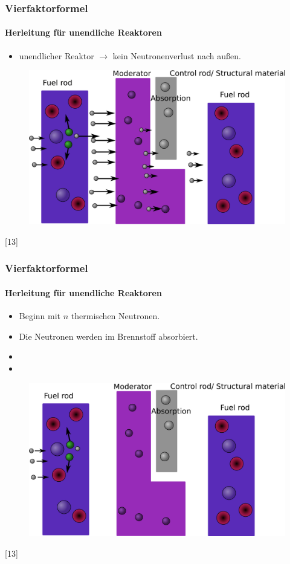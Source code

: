 \documentclass{beamer}[9pt]
\begin{document}
\begin{frame}
\frametitle{Vierfaktorformel}
\framesubtitle{Herleitung für unendliche Reaktoren}
\begin{itemize}
\item unendlicher Reaktor $\rightarrow$ kein Neutronenverlust nach außen.
\end{itemize}

\begin{figure}
\centering
\includegraphics[scale=.2]{thermal_reactor_full.png}
\end{figure}
\hspace{.5\textwidth}[13]
\end{frame}


\begin{frame}
\frametitle{Vierfaktorformel}
\framesubtitle{Herleitung für unendliche Reaktoren}
\begin{itemize}
\item Beginn mit $n$ thermischen Neutronen.
\item Die Neutronen werden im Brennstoff absorbiert.
\item[]
\item[]
\end{itemize}

\begin{figure}
\centering
\includegraphics[scale=.15]{thermal_reactor_1.png}
\end{figure}
\hspace{.5\textwidth}[13]
\end{frame}
\end{document}
